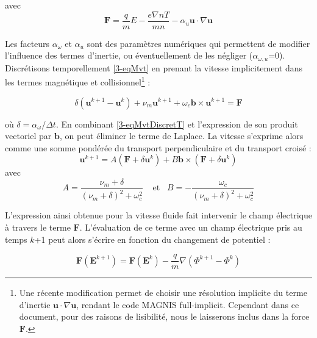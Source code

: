 \begin{refsection}
avec 
\begin{equation*}\mathbf F=\frac{q}{m}E-\frac{e\nabla
n T}{m
n}-\alpha_u\mathbf{u}\cdot\nabla\mathbf{u}
\end{equation*}

Les facteurs $\alpha_\omega$ et $\alpha_u$ sont des paramètres numériques qui
permettent de modifier l'influence des termes d'inertie, ou éventuellement de
les négliger ($\alpha_{\omega,u}$=0). Discrétisons temporellement
\eqref{3-eqMvt} en prenant la vitesse implicitement dans les termes
magnétique et collisionnel\footnote{Une récente modification permet de choisir
une résolution implicite du terme
d'inertie $\mathbf{u}\cdot\nabla\mathbf{u}$, rendant le code MAGNIS
full-implicit. Cependant dans ce document, pour des raisons de lisibilité, nous
le laisserons inclus dans la force $\mathbf F$.} :

\begin{equation}
\label{3-eqMvtDiscretT}
\delta\left(\mathbf{u}^{k+1}-\mathbf{u}^{k}\right) + 
\nu_m\mathbf{u}^{k+1}+\omega_{c}\mathbf{b}\times\mathbf{u}^{k+1}=
\mathbf F
\end{equation}

où $\delta=\alpha_\omega/\Delta t$. En combinant \ref{3-eqMvtDiscretT} et
l'expression de son produit vectoriel par $\mathbf b$, on peut éliminer le
terme de Laplace. La vitesse s'exprime alors comme une somme pondérée du
transport perpendiculaire et du transport croisé :
\begin{equation}
\label{3-eqMvtPonderee}
\mathbf{u}^{k+1}=A\left(\mathbf F + \delta\mathbf{u}^{k}\right)+ B\mathbf
b\times\left(\mathbf F + \delta\mathbf{u}^{k}\right)
\end{equation}
avec 
\begin{equation*}
\label{3-coefficientsVitesses}
A=\frac{\nu_m+\delta}{(\nu_m+\delta)^2+\omega_c^2}\;\;\;\;\text{et}\;\;\;B=-\frac{\omega_c}{(\nu_m+\delta)^2+\omega_c^2}
\end{equation*}

L'expression ainsi obtenue pour la vitesse
fluide fait intervenir le champ électrique à travers le terme $\mathbf F$.
L'évaluation de ce terme avec un champ électrique pris au temps $k$+1 peut alors
s'écrire en fonction du changement de potentiel :

\begin{equation}
\label{3-eqCorrection}
\mathbf F(\mathbf E^{k+1}) = \mathbf F(\mathbf E^{k})-\frac{q}{m}\nabla
(\Phi^{k+1}-\Phi^{k})
\end{equation}


\end{refsection}
